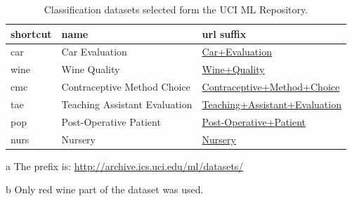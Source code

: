 \begin{table}
	\centering
	\begin{threeparttable}
		\begin{tabular}{lll}
shortcut & name & url suffix\tnote{a}\\
\hline
car    & Car Evaluation  & \href{http://archive.ics.uci.edu/ml/datasets/Car+Evaluation}{\ttfamily Car+Evaluation}\\
wine\tnote{b} & Wine Quality  & \href{http://archive.ics.uci.edu/ml/datasets/Wine+Quality}{\ttfamily Wine+Quality}\\
cmc    & Contraceptive Method Choice  & \href{http://archive.ics.uci.edu/ml/datasets/Contraceptive+Method+Choice}{\ttfamily Contraceptive+Method+Choice}\\
tae    & Teaching Assistant Evaluation  & \href{http://archive.ics.uci.edu/ml/datasets/Teaching+Assistant+Evaluation}{\ttfamily Teaching+Assistant+Evaluation}\\
pop    & Post-Operative Patient  & \href{http://archive.ics.uci.edu/ml/datasets/Post-Operative+Patient}{\ttfamily Post-Operative+Patient}\\
nurs   & Nursery  & \href{http://archive.ics.uci.edu/ml/datasets/Nursery}{\ttfamily Nursery}\\
\hline
		\end{tabular}
		\begin{tablenotes}
			\item [a] The prefix is: \url{http://archive.ics.uci.edu/ml/datasets/}
			\item [b] Only red wine part of the dataset was used.
		\end{tablenotes}
		\caption{Classification datasets selected form the UCI ML Repository.} \label{tab:UCI_datasets}
	\end{threeparttable}
	
\end{table}



